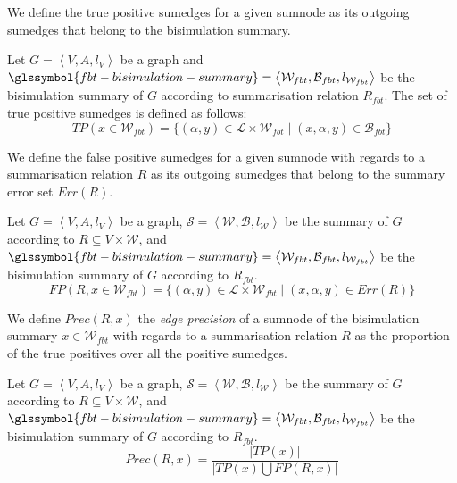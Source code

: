 We define the true positive sumedges for a given sumnode as its outgoing sumedges that belong to the bisimulation summary.

\begin{definition}
Let $G=\left\langle V, A, l_V \right\rangle$ be a graph and $\glssymbol{fbt-bisimulation-summary} = \left\langle \mathcal{W}_{fbt}, \mathcal{B}_{fbt}, l_{\mathcal{W}_{fbt}} \right\rangle$ be the bisimulation summary of $G$ according to summarisation relation $R_{fbt}$.
The set of true positive sumedges is defined as follows:
$$
TP(x \in \mathcal{W}_{fbt}) = \{ (\alpha, y) \in \mathcal{L} \times \mathcal{W}_{fbt} \mid (x, \alpha, y) \in \mathcal{B}_{fbt} \}
$$
\end{definition}

We define the false positive sumedges for a given sumnode with regards to a summarisation relation $R$ as its outgoing sumedges that belong to the summary error set $Err(R)$.

\begin{definition}
Let $G=\left\langle V, A, l_V \right\rangle$ be a graph, $\mathcal{S} = \left\langle \mathcal{W}, \mathcal{B}, l_{\mathcal{W}} \right\rangle$ be the summary of $G$ according to $R \subseteq V \times \mathcal{W}$, and $\glssymbol{fbt-bisimulation-summary} = \left\langle \mathcal{W}_{fbt}, \mathcal{B}_{fbt}, l_{\mathcal{W}_{fbt}} \right\rangle$ be the bisimulation summary of $G$ according to $R_{fbt}$.
$$
FP(R, x \in \mathcal{W}_{fbt}) = \{ (\alpha, y) \in \mathcal{L} \times \mathcal{W}_{fbt} \mid (x, \alpha, y) \in Err(R) \}
$$
\end{definition}

We define $Prec(R, x)$ the \emph{edge precision} of a sumnode of the bisimulation summary $x \in \mathcal{W}_{fbt}$ with regards to a summarisation relation $R$ as the proportion of the true positives over all the positive sumedges.

\begin{definition}
Let $G=\left\langle V, A, l_V \right\rangle$ be a graph, $\mathcal{S} = \left\langle \mathcal{W}, \mathcal{B}, l_{\mathcal{W}} \right\rangle$ be the summary of $G$ according to $R \subseteq V \times \mathcal{W}$, and $\glssymbol{fbt-bisimulation-summary} = \left\langle \mathcal{W}_{fbt}, \mathcal{B}_{fbt}, l_{\mathcal{W}_{fbt}} \right\rangle$ be the bisimulation summary of $G$ according to $R_{fbt}$.
$$
Prec(R, x) = \frac{\vert TP(x) \vert}{\vert TP(x) \bigcup FP(R, x) \vert}
$$
\end{definition}

